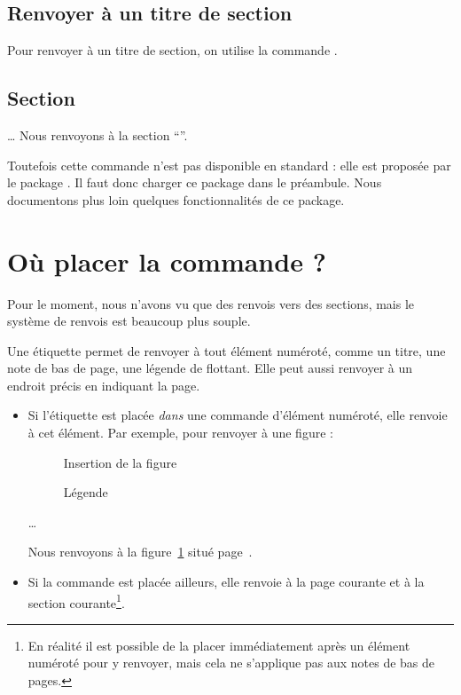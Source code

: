 \subsection{Renvoyer à un titre de section}\label{renvoititre}

Pour renvoyer à un titre de section, on utilise la commande .

\begin{latexcode}
\section{Section} \label{etiquette}
…
Nous renvoyons à la section  \enquote{}.
\end{latexcode}

Toutefois cette commande n'est pas disponible en standard : elle est proposée par le package . Il faut donc charger ce package dans le préambule. Nous documentons plus loin quelques fonctionnalités de ce package.


\section{Où placer la commande  ?}

Pour le moment, nous n'avons vu que des renvois vers des sections, mais le système de renvois est beaucoup plus souple.

Une étiquette permet de renvoyer à tout élément numéroté, comme un titre, une note de bas de page, une légende de flottant. Elle peut aussi renvoyer à un endroit précis en indiquant la page.

\begin{itemize}
\item Si l'étiquette  est placée \emph{dans}  une commande  d'élément numéroté, elle renvoie à cet élément. Par exemple, pour renvoyer à une figure  :

\begin{latexcode}
\begin{figure}[paramètre de placement]
    Insertion de la figure
    \caption{Légende\label{figure}}
\end{figure} 
…

Nous renvoyons à la figure~\ref{figure} situé page~\pageref{figure}.
\end{latexcode}

\item Si la commande est placée ailleurs, elle renvoie à la page courante et à la section courante\footnote{En réalité il est possible de la placer immédiatement après un élément numéroté pour y renvoyer, mais cela ne s'applique pas aux notes de bas de pages.}.
\end{itemize}

